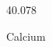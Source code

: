 \documentclass[12pt]{article}
\begin{document}
\hfill{}
\vfill
\begin{center}
  {\fontsize{50}{60}
  }

  40.078

Calcium
\end{center}
\vfill
\end{document}

